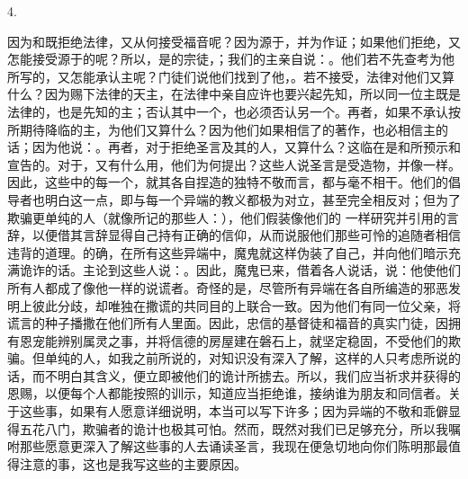 4. \par

因为和既拒绝法律，又从何接受福音呢？因为源于，并为作证；如果他们拒绝，又怎能接受源于的呢？所以，是的宗徒，；我们的主亲自说：。他们若不先查考为他所写的，又怎能承认主呢？门徒们说他们找到了他，。若不接受，法律对他们又算什么？因为赐下法律的天主，在法律中亲自应许也要兴起先知，所以同一位主既是法律的，也是先知的主；否认其中一个，也必须否认另一个。再者，如果不承认按所期待降临的主，为他们又算什么？因为他们如果相信了的著作，也必相信主的话；因为他说：。再者，对于拒绝圣言及其的人，又算什么？这临在是和所预示和宣告的。对于，又有什么用，他们为何提出？这些人说圣言是受造物，并像一样。因此，这些中的每一个，就其各自捏造的独特不敬而言，都与毫不相干。他们的倡导者也明白这一点，即与每一个异端的教义都极为对立，甚至完全相反对；但为了欺骗更单纯的人（就像所记的那些人：），他们假装像他们的 一样研究并引用的言辞，以便借其言辞显得自己持有正确的信仰，从而说服他们那些可怜的追随者相信违背的道理。的确，在所有这些异端中，魔鬼就这样伪装了自己，并向他们暗示充满诡诈的话。主论到这些人说：。因此，魔鬼已来，借着各人说话，说：他使他们所有人都成了像他一样的说谎者。奇怪的是，尽管所有异端在各自所编造的邪恶发明上彼此分歧，却唯独在撒谎的共同目的上联合一致。因为他们有同一位父亲，将谎言的种子播撒在他们所有人里面。因此，忠信的基督徒和福音的真实门徒，因拥有恩宠能辨别属灵之事，并将信德的房屋建在磐石上，就坚定稳固，不受他们的欺骗。但单纯的人，如我之前所说的，对知识没有深入了解，这样的人只考虑所说的话，而不明白其含义，便立即被他们的诡计所掳去。所以，我们应当祈求并获得的恩赐，以便每个人都能按照的训示，知道应当拒绝谁，接纳谁为朋友和同信者。关于这些事，如果有人愿意详细说明，本当可以写下许多；因为异端的不敬和乖僻显得五花八门，欺骗者的诡计也极其可怕。然而，既然对我们已足够充分，所以我嘱咐那些愿意更深入了解这些事的人去诵读圣言，我现在便急切地向你们陈明那最值得注意的事，这也是我写这些的主要原因。\par

